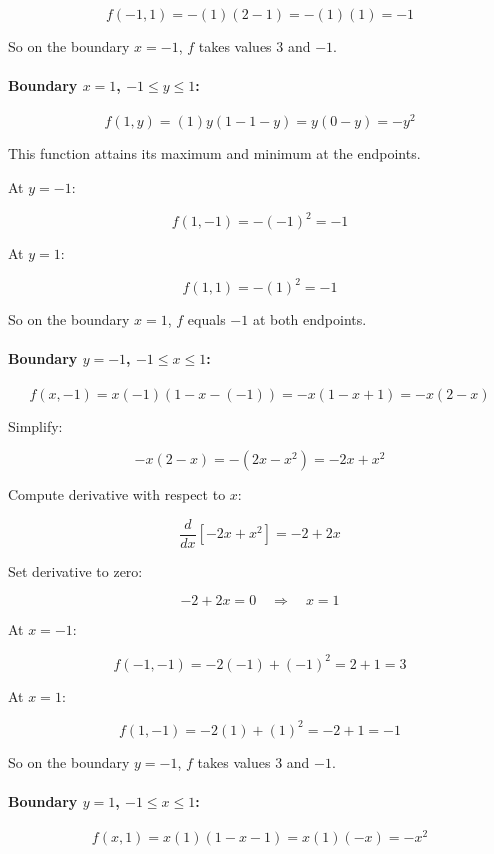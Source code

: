 \documentclass[11pt]{article}
\begin{document}
\[
f(-1, 1) = - (1)(2 - 1) = - (1)(1) = -1
\]

So on the boundary \( x = -1 \), \( f \) takes values \( 3 \) and \( -1 \).

\paragraph{Boundary \( x = 1 \), \( -1 \leq y \leq 1 \):}

\[
f(1, y) = (1)y(1 - 1 - y) = y(0 - y) = - y^2
\]

This function attains its maximum and minimum at the endpoints.

At \( y = -1 \):

\[
f(1, -1) = - (-1)^2 = -1
\]

At \( y = 1 \):

\[
f(1, 1) = - (1)^2 = -1
\]

So on the boundary \( x = 1 \), \( f \) equals \( -1 \) at both endpoints.

\paragraph{Boundary \( y = -1 \), \( -1 \leq x \leq 1 \):}

\[
f(x, -1) = x(-1)(1 - x - (-1)) = - x (1 - x + 1 ) = - x (2 - x)
\]

Simplify:

\[
- x (2 - x ) = - (2 x - x^2 ) = -2 x + x^2
\]

Compute derivative with respect to \( x \):

\[
\frac{d}{dx} [ -2 x + x^2 ] = -2 + 2 x
\]

Set derivative to zero:

\[
-2 + 2 x = 0 \quad \Rightarrow \quad x = 1
\]

At \( x = -1 \):

\[
f(-1, -1) = -2(-1) + (-1)^2 = 2 + 1 = 3
\]

At \( x = 1 \):

\[
f(1, -1) = -2(1) + (1)^2 = -2 + 1 = -1
\]

So on the boundary \( y = -1 \), \( f \) takes values \( 3 \) and \( -1 \).

\paragraph{Boundary \( y = 1 \), \( -1 \leq x \leq 1 \):}

\[
f(x, 1) = x (1) (1 - x - 1) = x (1)(- x ) = - x^2
\]
\end{document}
